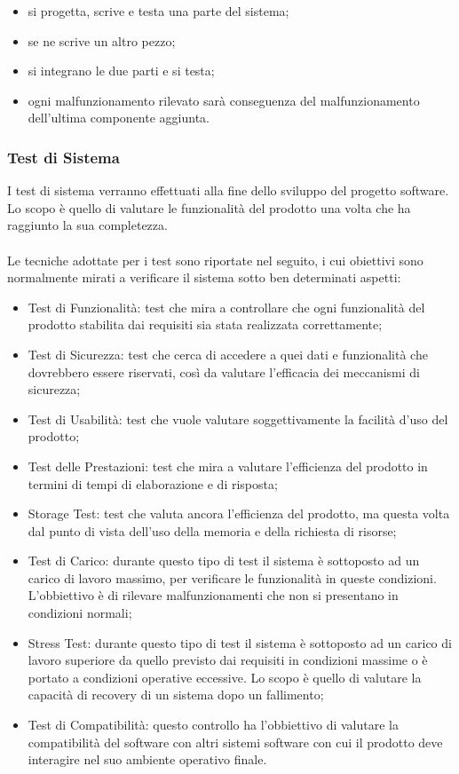 \begin{itemize}
  \item si progetta, scrive e testa una parte del sistema;
  \item se ne scrive un altro pezzo;
  \item si integrano le due parti e si testa;
  \item ogni malfunzionamento rilevato sar\`a conseguenza del malfunzionamento
  dell'ultima componente aggiunta.
\end{itemize}

\subsubsection*{Test di Sistema}
I test di sistema verranno effettuati alla fine dello sviluppo del progetto
software. Lo scopo \`e quello di valutare le funzionalit\`a del prodotto una volta 
che ha raggiunto la sua completezza.\\ \\ 
Le tecniche adottate per i test sono riportate nel seguito, i cui obiettivi sono 
normalmente mirati a verificare il sistema sotto ben determinati aspetti:

\begin{itemize}
  \item Test di Funzionalit\`a: test che mira a controllare che ogni
  funzionalit\`a del prodotto stabilita dai requisiti sia stata realizzata correttamente;
  \item Test di Sicurezza: test che cerca di accedere a quei dati e
  funzionalit\`a che dovrebbero essere riservati, cos\`i da valutare l'efficacia dei meccanismi di sicurezza;
  \item Test di Usabilit\`a:  test che vuole valutare soggettivamente la facilit\`a
  d'uso del prodotto;
  \item Test delle Prestazioni: test che mira a valutare l'efficienza del
  prodotto in termini di tempi di elaborazione e di risposta;
  \item Storage Test: test che valuta ancora l'efficienza del
  prodotto, ma questa volta dal punto di vista dell'uso della memoria e della
  richiesta di risorse;
  \item Test di Carico: durante questo tipo di test il sistema \`e sottoposto ad
  un carico di lavoro massimo, per verificare le funzionalit\`a in queste
  condizioni. L'obbiettivo \`e di rilevare malfunzionamenti che non si presentano in condizioni normali;
  \item Stress Test: durante questo tipo di test il sistema \`e sottoposto ad un
  carico di lavoro superiore da quello previsto dai requisiti in condizioni
  massime o \`e portato a condizioni operative eccessive. Lo scopo \`e quello di valutare la capacit\`a di recovery di un sistema dopo un fallimento;
  \item Test di Compatibilit\`a: questo controllo ha l'obbiettivo di valutare la
  compatibilit\`a del software con altri sistemi software con cui il prodotto deve interagire nel suo ambiente operativo finale.
 \end{itemize}


